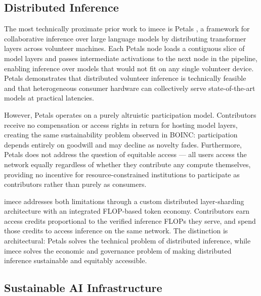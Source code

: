 \documentclass[12pt]{article}
\begin{document}
\subsection{Distributed Inference}

The most technically proximate prior work to imece is Petals \cite{borzunov2022petals}, a framework for collaborative inference over large language models by distributing transformer layers across volunteer machines. Each Petals node loads a contiguous slice of model layers and passes intermediate activations to the next node in the pipeline, enabling inference over models that would not fit on any single volunteer device. Petals demonstrates that distributed volunteer inference is technically feasible and that heterogeneous consumer hardware can collectively serve state-of-the-art models at practical latencies.

However, Petals operates on a purely altruistic participation model. Contributors receive no compensation or access rights in return for hosting model layers, creating the same sustainability problem observed in BOINC: participation depends entirely on goodwill and may decline as novelty fades. Furthermore, Petals does not address the question of equitable access — all users access the network equally regardless of whether they contribute any compute themselves, providing no incentive for resource-constrained institutions to participate as contributors rather than purely as consumers.

imece addresses both limitations through a custom distributed layer-sharding architecture with an integrated FLOP-based token economy. Contributors earn access credits proportional to the verified inference FLOPs they serve, and spend those credits to access inference on the same network. The distinction is architectural: Petals solves the technical problem of distributed inference, while imece solves the economic and governance problem of making distributed inference sustainable and equitably accessible.

\subsection{Sustainable AI Infrastructure}
\end{document}
